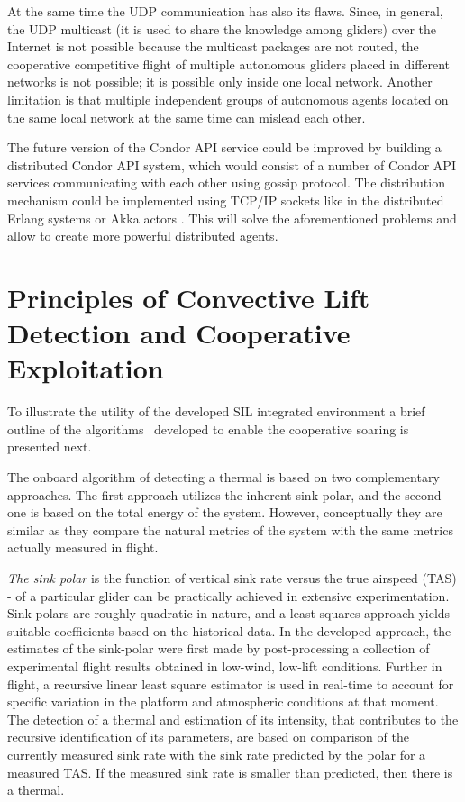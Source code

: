 \documentclass[letterpaper, 10 pt, conference]{ieeeconf}  %
\newcommand{\squeezeup}{\vspace{-1.0mm}}
\begin{document}
At the same time the UDP communication has also its flaws. Since, in general, the UDP multicast (it is used to share the knowledge among gliders) over the Internet is not possible because the multicast packages are not routed, the cooperative competitive flight of multiple autonomous gliders placed in different networks is not possible; it is possible only inside one local network. Another limitation
is that multiple independent groups of autonomous agents located on the same local network at the same time can mislead each other.

The future version of the Condor API service could be improved by building a distributed Condor API system, which would consist of a number of Condor API services communicating with each other using gossip protocol\cite{Gupta:2006}. The distribution mechanism could be implemented using TCP/IP sockets like in the distributed Erlang systems \cite{Erlang:2013:Online} or Akka actors \cite{Akka:2013:Online}. This will solve the aforementioned problems and allow to create more powerful distributed agents.

\section{Principles of Convective Lift Detection and Cooperative Exploitation}
\squeezeup
To illustrate the utility of the developed SIL integrated environment a brief outline of the algorithms~\cite{AKlass_JGCD:2012} developed to enable the cooperative soaring is presented next.

The onboard algorithm of detecting a thermal is based on two complementary approaches. The first approach utilizes the inherent sink polar, and the second one is based on the total energy of the system. However, conceptually they are similar as they compare the natural metrics of the system with the same metrics actually measured in flight.

\emph{The sink polar} is the function of vertical sink rate versus the true airspeed (TAS) - of a particular glider can be practically achieved in extensive experimentation. Sink polars are roughly quadratic in nature, and a least-squares approach yields suitable coefficients based on the historical data. In the developed approach, the estimates of the sink-polar were first made by post-processing a collection of experimental flight results obtained in low-wind, low-lift conditions. Further in flight, a recursive linear least square estimator is used in real-time to account for specific variation in the platform and atmospheric conditions at that moment. The detection of a thermal and estimation of its intensity, that contributes to the recursive identification of its parameters, are based on comparison of the currently measured sink rate with the sink rate predicted by the polar for a measured TAS. If the measured sink rate is smaller than predicted, then there is a thermal.
\end{document}
